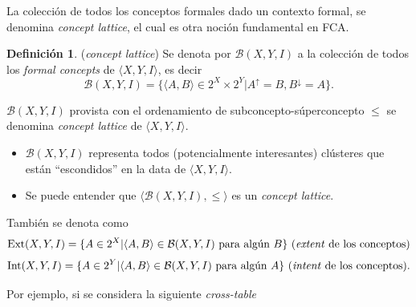 \documentclass[12pt,oneside,letterpaper]{book}
\newcommand{\eng}[1]{\textit{#1}\xspace}			%
\newcommand{\abr}[1]{\textsc{#1}\xspace}           %
\theoremstyle{definition}
\newtheorem{definition}{Definición}[section]
\newcommand{\Beta}{\mathcal{B}}
\begin{document}
La colección de todos los conceptos formales dado un contexto formal, se denomina \eng{concept lattice}, el cual es otra noción fundamental en \abr{FCA}.

\begin{definition}{(\eng{concept lattice})}
	Se denota por $\Beta(X,Y,I)$ a la colección de todos los \eng{formal concepts} de $\langle X,Y,I \rangle$, es decir
\begin{equation*}
	\Beta(X,Y,I) = \{\langle A,B\rangle \in 2^X\times2^Y | A^\uparrow = B, B^\downarrow = A\}.
\end{equation*}
\end{definition}

$\Beta(X,Y,I)$ provista con el ordenamiento de subconcepto-súperconcepto $\le$ se denomina \eng{concept lattice} de $\langle X,Y,I \rangle$.

\begin{itemize}
	\item $\Beta(X,Y,I)$ representa todos (potencialmente interesantes) clústeres que están ``escondidos'' en la data de $\langle X,Y,I \rangle$.
	\item Se puede entender que $\langle \Beta(X,Y,I),\le \rangle$ es un \eng{concept lattice}.
\end{itemize}

También se denota como
\begin{equation*}
	\text{Ext}(X,Y,I) = \{A \in 2^X | \langle A,B \rangle \in \Beta(X,Y,I) \text{ para algún }B \} \text{ (\eng{extent} de los conceptos)}
\end{equation*}
\begin{equation*}
	\text{Int}(X,Y,I) = \{A \in 2^Y | \langle A,B \rangle \in \Beta(X,Y,I) \text{ para algún }A \} \text{ (\eng{intent} de los conceptos)}.
\end{equation*}

Por ejemplo, si se considera la siguiente \eng{cross-table} ~\cite{Ganter1997}
\end{document}
